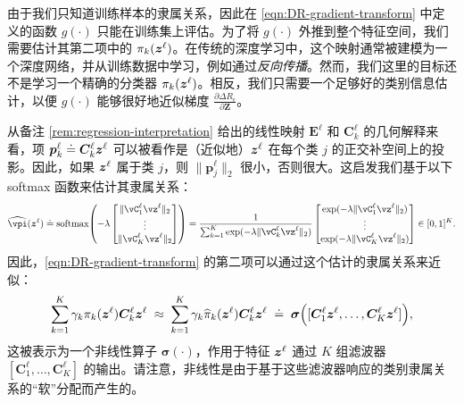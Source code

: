 \documentclass[../../book-main.tex]{subfiles}
\begin{document}
由于我们只知道训练样本的隶属关系，因此在 \eqref{eqn:DR-gradient-transform} 中定义的函数 $g(\cdot)$ 只能在训练集上评估。为了将 $g(\cdot)$ 外推到整个特征空间，我们需要估计其第二项中的 $\pi_k(\bm{z}^\ell)$。在传统的深度学习中，这个映射通常被建模为一个深度网络，并从训练数据中学习，例如通过{\em 反向传播}。然而，我们这里的目标还不是学习一个精确的分类器 $\pi_{k}(\bm{z}^\ell)$。相反，我们只需要一个足够好的类别信息估计，以便 $g(\cdot)$ 能够很好地近似梯度 $\frac{\partial \Delta R_{\epsilon}}{\partial \bm Z}$。



从备注 \ref{rem:regression-interpretation} 给出的线性映射 $\bm E^\ell$ 和 $\bm C_k^\ell$ 的几何解释来看，项 $\bm p_{k}^{\ell} \doteq \bm C^{\ell}_k \bm{z}^{\ell}$ 可以被看作是（近似地）$\bm{z}^{\ell}$ 在每个类 $j$ 的正交补空间上的投影。因此，如果 $\bm{z}^\ell$ 属于类 $j$，则 $\|\bm p_{j}^{\ell}\|_2$ 很小，否则很大。这启发我们基于以下 softmax 函数来估计其隶属关系：
\begin{equation}
    \widehat{\vpi}(\z^\ell) \doteq \softmax\rp{-\lambda\mat{\norm{\vC^{\ell}_{1}\vz^{\ell}}_{2} \\ \vdots \\ \norm{\vC^{\ell}_{K}\vz^{\ell}}_{2}}} = \frac{1}{\sum_{k = 1}^{K}\exp(-\lambda \norm{\vC^{\ell}_{k}\vz^{\ell}}_{2})}\mat{\exp(-\lambda\norm{\vC^{\ell}_{1}\vz^{\ell}}_{2}) \\ \vdots \\ \exp(-\lambda\norm{\vC^{\ell}_{K}\vz^{\ell}}_{2})} \in [0,1]^{K}.
\end{equation}
因此，\eqref{eqn:DR-gradient-transform} 的第二项可以通过这个估计的隶属关系来近似：
\begin{align}
\sum_{k=1}^K \gamma_{k} \pi_k(\bm{z}^\ell)\bm C_{k}^{\ell}  \bm{z}^{\ell} 
\; \approx \;  \sum_{k=1}^K \gamma_{k} \widehat{\pi}_k(\bm{z}^\ell)  \bm{C}^{\ell}_k  \bm{z}^{\ell} 
\; \doteq \; \bm \sigma\Big([\bm{C}^{\ell}_{1} \bm{z}^{\ell}, \dots, \bm{C}^{\ell}_{K} \bm{z}^{\ell}]\Big),
\label{eqn:soft-residual}
\end{align}
这被表示为一个非线性算子 $\bm \sigma(\cdot)$，作用于特征 $\bm{z}^\ell$ 通过 $K$ 组滤波器 $[\bm{C}^{\ell}_{1}, \dots, \bm{C}^{\ell}_{K}]$ 的输出。请注意，非线性是由于基于这些滤波器响应的类别隶属关系的“软”分配而产生的。
\end{document}
